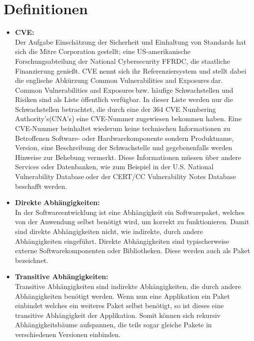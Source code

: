 \section{Definitionen} \label{sec:Definitionen}
\begin{itemize}
    \item \textbf{\acf{CVE}:} \\
    Der Aufgabe Einschätzung der Sicherheit und Einhaltung von Standards hat sich die Mitre Corporation\textsuperscript{\cite{link:MitreCve}} gestellt; eine US-amerikanische Forschungsabteilung der \glqq National Cybersecurity FFRDC\grqq, die staatliche Finanzierung genießt.
    \acs{CVE} nennt sich ihr Referenziersystem und stellt dabei die englische Abkürzung \glqq Common Vulnerabilities and Exposures\grqq$~$dar.
    \\
    \glqq Common Vulnerabilities and Exposures\grqq$~$bzw. häufige Schwachstellen und Risiken sind als Liste öffentlich verfügbar.
    In dieser Liste werden nur die Schwachstellen betrachtet, die durch eine der 364 \glqq \ac{CVE} Numbering Authority's\grqq (\acs{CNA}'s) eine \ac{CVE}-Nummer zugewiesen bekommen haben.\cite{link:CveOrgCnaS}
    Eine \ac{CVE}-Nummer beinhaltet wiederum keine technischen Informationen zu Betroffenen Software- oder Hardwarekomponente sondern Produktname, Version, eine Beschreibung der Schwachstelle und gegebenenfalls werden Hinweise zur Behebung vermerkt.
    Diese Informationen müssen über andere Services oder Datenbanken, wie zum Beispiel in der \glqq U.S. National Vulnerability Database\grqq\textsuperscript{\cite{link:nvdNist}}$~$oder der \glqq CERT/CC Vulnerability Notes Database\grqq\textsuperscript{\cite{link:VNBcert}}$~$beschafft werden.

    \item \textbf{Direkte Abhängigkeiten:} \\
    In der Softwareentwicklung ist eine Abhängigkeit ein Softwarepaket, welches von der Anwendung selbst benötigt wird, um korrekt zu funktionieren.
    Damit sind direkte Abhängigkeiten nicht, wie indirekte, durch andere Abhängigkeiten eingeführt.
    Direkte Abhängigkeiten sind typischerweise externe Softwarekomponenten oder Bibliotheken.
    Diese werden auch als Paket bezeichnet. 

    \item \textbf{Transitive Abhängigkeiten:} \\
    Transitive Abhängigkeiten sind indirekte Abhängigkeiten, die durch andere Abhängigkeiten benötigt werden.
    Wenn nun eine Applikation ein Paket einbindet welches ein weiteres Paket selbst benötigt, so ist dieses eine transitive Abhängigkeit der Applikation.
    Somit können sich rekursiv Abhängigkeitsbäume aufspannen, die teils sogar gleiche Pakete in verschiedenen Versionen einbinden.


\end{itemize}
